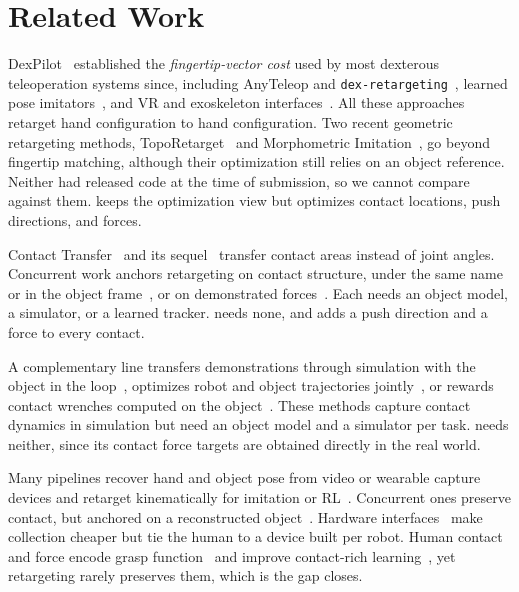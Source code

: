 \section{Related Work}
\label{sec:related}

DexPilot~\citep{dexpilot} established the \emph{fingertip-vector cost} used by most dexterous teleoperation systems since, including AnyTeleop and \texttt{dex-retargeting}~\citep{anyteleop}, learned pose imitators~\citep{telekinesis, geort}, and VR and exoskeleton interfaces~\citep{opentelevision, bunnyvisionpro, ace, doglove}. All these approaches retarget hand configuration to hand configuration. Two recent geometric retargeting methods, TopoRetarget~\citep{toporetarget} and Morphometric Imitation~\citep{morphometric}, go beyond fingertip matching, although their optimization still relies on an object reference. Neither had released code at the time of submission, so we cannot compare against them. \ours keeps the optimization view but optimizes contact locations, push directions, and forces.

Contact Transfer~\citep{lakshmipathy2022contacttransfer} and its sequel~\citep{contactretarget} transfer contact areas instead of joint angles. Concurrent work anchors retargeting on contact structure, under the same name~\citep{contactanchored} or in the object frame~\citep{hoiretarget}, or on demonstrated forces~\citep{reforce, atar2026contact}. Each needs an object model, a simulator, or a learned tracker. \ours needs none, and adds a push direction and a force to every contact.

A complementary line transfers demonstrations through simulation with the object in the loop~\citep{maniptrans, dextrack, quasisim, pgdm, objdex, omnigrasp, dexmachina}, optimizes robot and object trajectories jointly~\citep{omniretarget}, or rewards contact wrenches computed on the object~\citep{chord}. These methods capture contact dynamics in simulation but need an object model and a simulator per task. \ours needs neither, since its contact force targets are obtained directly in the real world.

Many pipelines recover hand and object pose from video or wearable capture devices and retarget kinematically for imitation or RL~\citep{dexmv, dexvip, videodex, doasido, dexcap, h2o, omnih2o, humanplus}. Concurrent ones preserve contact, but anchored on a reconstructed object~\citep{sun2026egocpt, ren2026c2dex, mao2026omnihoi, niu2026egoaero}. Hardware interfaces~\citep{aloha, umi, airexo, dexumi} make collection cheaper but tie the human to a device built per robot. Human contact and force encode grasp function~\citep{contactpose, grab, tactileglove, contactgrasp} and improve contact-rich learning~\citep{forcemimic, acp, forcesight, ftf}, yet retargeting rarely preserves them, which is the gap \ours closes.

